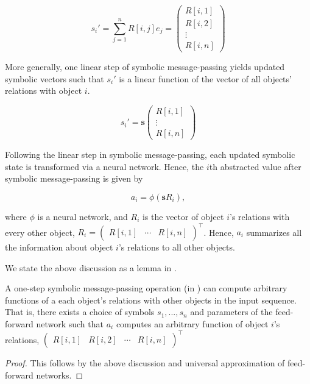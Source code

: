 \begin{equation*}
	s_i' =  \sum_{j=1}^{n} R[i,j] e_j = \begin{pmatrix}R[i,1] \\ R[i,2] \\ \vdots \\ R[i,n]\end{pmatrix}
\end{equation*}

More generally, one linear step of symbolic message-passing yields updated symbolic vectors such that $s_i'$ is a linear function of the vector of all objects' relations with object $i$.

\begin{equation*}
	s_i' = \boldsymbol{s} \begin{pmatrix}R[i,1] \\ \vdots \\ R[i,n]\end{pmatrix}
\end{equation*}

Following the linear step in symbolic message-passing, each updated symbolic state is transformed via a neural network. Hence, the $i$th abstracted value after symbolic message-passing is given by 

\begin{equation*}
	a_i = \phi\left(\boldsymbol{s} R_i \right),
\end{equation*}

\noindent where $\phi$ is a neural network, and $R_i$ is the vector of object $i$'s relations with every other object, $R_i = \begin{pmatrix}R[i,1] & \cdots & R[i,n]\end{pmatrix}^\top$. Hence, $a_i$ summarizes all the information about object $i$'s relations to all other objects.

We state the above discussion as a lemma in .

\begin{lemma}
	\label{lemma:function_class_1_step_symbolic_mp}
	A one-step symbolic message-passing operation (in ) can compute arbitrary functions of a each object's relations with other objects in the input sequence. That is, there exists a choice of symbols $s_1, ..., s_n$ and parameters of the feed-forward network such that $a_i$ computes an arbitrary function of object $i$'s relations, $\begin{pmatrix}R[i,1] & R[i,2] & \cdots & R[i,n]\end{pmatrix}^\top$
\end{lemma}
\begin{proof}
	This follows by the above discussion and universal approximation of feed-forward networks.
\end{proof}

